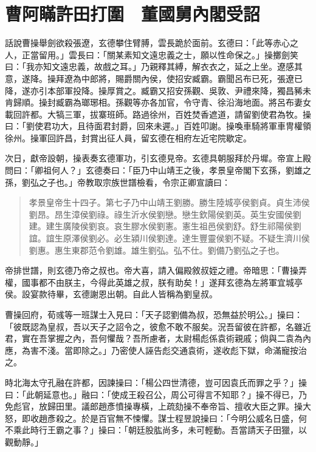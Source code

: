 
\chapter{曹阿瞞許田打圍　董國舅內閣受詔}

話說曹操舉劍欲殺張遼，玄德攀住臂膊，雲長跪於面前。玄德曰：「此等赤心之人，正當留用。」雲長曰：「關某素知文遠忠義之士，願以性命保之。」操擲劍笑曰：「我亦知文遠忠義，故戲之耳。」乃親釋其縛，解衣衣之，延之上坐。遼感其意，遂降。操拜遼為中郎將，賜爵關內侯，使招安臧霸。霸聞呂布已死，張遼已降，遂亦引本部軍投降。操厚賞之。臧霸又招安孫觀、吳敦、尹禮來降，獨昌豨未肯歸順。操封臧霸為瑯琊相。孫觀等亦各加官，令守青、徐沿海地面。將呂布妻女載回許都。大犒三軍，拔寨班師。路過徐州，百姓焚香遮道，請留劉使君為牧。操曰：「劉使君功大，且待面君封爵，回來未遲。」百姓叩謝。操喚車騎將軍車冑權領徐州。操軍回許昌，封賞出征人員，留玄德在相府左近宅院歇定。

次日，獻帝設朝，操表奏玄德軍功，引玄德見帝。玄德具朝服拜於丹墀。帝宣上殿問曰：「卿祖何人？」玄德奏曰：「臣乃中山靖王之後，孝景皇帝閣下玄孫，劉雄之孫，劉弘之子也。」帝教取宗族世譜檢看，令宗正卿宣讀曰：

\begin{quote}
孝景皇帝生十四子。第七子乃中山靖王劉勝。勝生陸城亭侯劉貞。貞生沛侯劉昂。昂生漳侯劉祿。祿生沂水侯劉戀。戀生欽陽侯劉英。英生安國侯劉建。建生廣陵侯劉哀。哀生膠水侯劉憲。憲生祖邑侯劉舒。舒生祁陽侯劉誼。誼生原澤侯劉必。必生潁川侯劉達。達生豐靈侯劉不疑。不疑生濟川侯劉惠。惠生東郡范令劉雄。雄生劉弘。弘不仕。劉備乃劉弘之子也。
\end{quote}

帝排世譜，則玄德乃帝之叔也。帝大喜，請入偏殿敘叔姪之禮。帝暗思：「曹操弄權，國事都不由朕主，今得此英雄之叔，朕有助矣！」遂拜玄德為左將軍宜城亭侯。設宴款待畢，玄德謝恩出朝。自此人皆稱為劉皇叔。

曹操回府，荀彧等一班謀士入見曰：「天子認劉備為叔，恐無益於明公。」操曰：「彼既認為皇叔，吾以天子之詔令之，彼愈不敢不服矣。況吾留彼在許都，名雖近君，實在吾掌握之內，吾何懼哉？吾所慮者，太尉楊彪係袁術親戚；倘與二袁為內應，為害不淺。當即除之。」乃密使人誣告彪交通袁術，遂收彪下獄，命滿寵按治之。

時北海太守孔融在許都，因諫操曰：「楊公四世清德，豈可因袁氏而罪之乎？」操曰：「此朝延意也。」融曰：「使成王殺召公，周公可得言不知耶？」操不得已，乃免彪官，放歸田里。議郎趙彥憤操專橫，上疏劾操不奉帝旨、擅收大臣之罪。操大怒，即收趙彥殺之。於是百官無不悚懼。謀士程昱說操曰：「今明公威名日盛，何不乘此時行王霸之事？」操曰：「朝廷股肱尚多，未可輕動。吾當請天子田獵，以觀動靜。」

